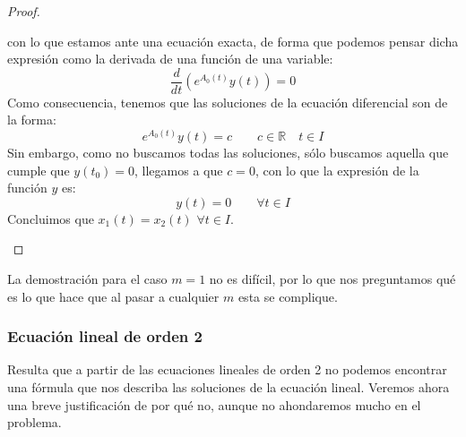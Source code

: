 \begin{prop}
\begin{proof}
\begin{description}
                con lo que estamos ante una ecuación exacta, de forma que podemos pensar dicha expresión como la derivada de una función de una variable:
                \begin{equation*}
                    \dfrac{d}{dt}\left(e^{A_0(t)}y(t)\right) = 0
                \end{equation*}
                Como consecuencia, tenemos que las soluciones de la ecuación diferencial son de la forma:
                \begin{equation*}
                    e^{A_0(t)} y(t) = c \qquad c\in \mathbb{R} \quad t\in I
                \end{equation*}
                Sin embargo, como no buscamos todas las soluciones, sólo buscamos aquella que cumple que $y(t_0) = 0$, llegamos a que $c = 0$, con lo que la expresión de la función $y$ es:
                \begin{equation*}
                    y(t) = 0 \qquad \forall t\in I
                \end{equation*}
                Concluimos que $x_1(t) = x_2(t)$ $\forall t\in I$.
        \end{description}
    \end{proof}
\end{prop}

La demostración para el caso $m=1$ no es difícil, por lo que nos preguntamos qué es lo que hace que al pasar a cualquier $m$ esta se complique.

\subsubsection{Ecuación lineal de orden 2}
Resulta que a partir de las ecuaciones lineales de orden 2 no podemos encontrar una fórmula que nos describa las soluciones de la ecuación lineal. Veremos ahora una breve justificación de por qué no, aunque no ahondaremos mucho en el problema.

